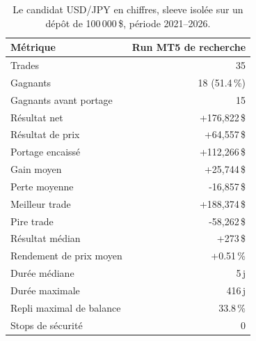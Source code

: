 \begin{table}[H]
\centering
\begin{tabular}{@{}lr@{}}
\toprule
\textbf{Métrique} & \textbf{Run MT5 de recherche} \\
\midrule
Trades & 35 \\
Gagnants & 18 (51.4\,\%) \\
Gagnants avant portage & 15 \\
Résultat net & +176,822\,\$ \\
Résultat de prix & +64,557\,\$ \\
Portage encaissé & +112,266\,\$ \\
Gain moyen & +25,744\,\$ \\
Perte moyenne & -16,857\,\$ \\
Meilleur trade & +188,374\,\$ \\
Pire trade & -58,262\,\$ \\
Résultat médian & +273\,\$ \\
Rendement de prix moyen & +0.51\,\% \\
Durée médiane & 5\,j \\
Durée maximale & 416\,j \\
Repli maximal de balance & 33.8\,\% \\
Stops de sécurité & 0 \\
\bottomrule
\end{tabular}
\caption{Le candidat USD/JPY en chiffres, sleeve isolée sur un dépôt de 100\,000\,\$, période 2021--2026.}
\end{table}
